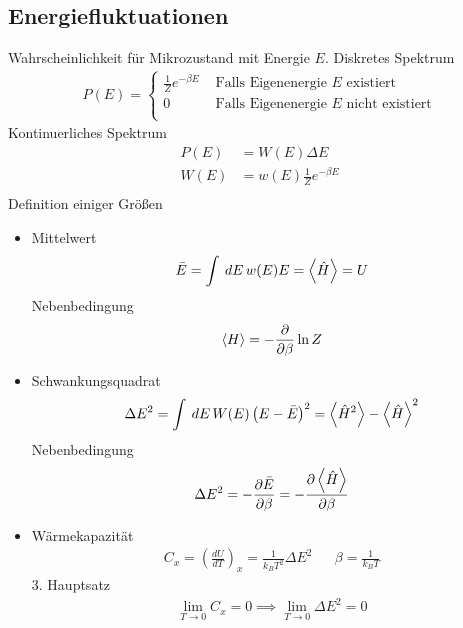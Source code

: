\documentclass[11pt]{article}
\theoremstyle{plain}
\theoremstyle{mytheoremstyle}
\newcommand{\pd}[2]{\frac{\partial #1 }{\partial #2}}
\renewcommand{\d}[1]{\,d#1\,}
\begin{document}
\subsection*{Energiefluktuationen}
Wahrscheinlichkeit f\"ur Mikrozustand mit Energie $E$.
Diskretes Spektrum 
%
\begin{align*}
  P(E) = 
  \begin{cases}
    \frac{1}{Z} e ^{-\beta E} & \text{ Falls Eigenenergie $E$ existiert} \\
    0                         & \text{ Falls Eigenenergie $E$ nicht existiert} \\
  \end{cases}
  \end{align*}
%
Kontinuerliches Spektrum 
%
\begin{align*}
  P(E) & = W(E) \Delta E \\
  W(E) & = w(E) \frac{1}{Z} e^{-\beta E} \\
\end{align*}
%
Definition einiger Gr\"o\ss{}en
\begin{itemize}
  \item Mittelwert 
    \begin{align*}
      \bar{E} = \int_{}^{} \d{E} w(E) E = \Braket{\hat{H}} = U
    \end{align*}
    Nebenbedingung
    \begin{align*}
      \Braket{H} = -\pd{}{\beta} \ln{Z} 
    \end{align*}
  \item Schwankungsquadrat 
    \begin{align*}
      \Delta E ^2 = \int_{}^{} \d{E} W(E) \left( E- \bar{E} \right) ^2 
      = \Braket{\hat{H}^2} - \Braket{\hat{H}} ^2
    \end{align*}
    Nebenbedingung
    \begin{align*}
      \Delta E^2 = - \pd{\bar{E}}{\beta} = - \pd{\Braket{\hat{H}}}{\beta}
    \end{align*}
  \item W\"armekapazit\"at 
    \begin{align*}
      C_x = \left( \frac{dU}{dT} \right)_x = \frac{1}{k_B T^2} \Delta E^2 &&
      \beta = \frac{1}{k_B T}
    \end{align*}
    3. Hauptsatz
    \begin{align*}
      \lim_{T \to  0} C_x = 0 \implies \lim_{T\to  0 } \Delta E^2 = 0 
    \end{align*}
\end{itemize}
\end{document}
